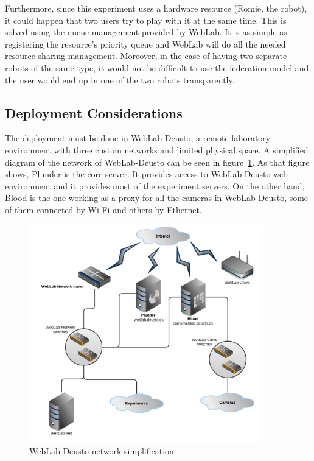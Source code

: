 Furthermore, since this experiment uses a hardware resource (Romie, the robot), it could happen that
two users try to play with it at the same time. This is solved using the queue management provided
by WebLab. It is as simple as registering the resource's priority queue and WebLab will do all the
needed resource sharing management. Moreover, in the case of having two separate robots of the same
type, it would not be difficult to use the federation model and the user would end up in one of the
two robots transparently.

\subsection{Deployment Considerations}

The deployment must be done in WebLab-Deusto, a remote laboratory environment with three custom
networks and limited physical space. A simplified diagram of the network of WebLab-Deusto can be
seen in figure~\ref{fig:weblab-network}. As that figure shows, Plunder is the core server. It
provides access to WebLab-Deusto web environment and it provides most of the experiment servers. On
the other hand, Blood is the one working as a proxy for all the cameras in WebLab-Deusto, some of
them connected by Wi-Fi and others by Ethernet.

\begin{figure}[!htbp]
	\centering
	\includegraphics[width=0.9\textwidth]{fig/weblab-network}
	\caption{WebLab-Deusto network simplification.}\label{fig:weblab-network}
\end{figure}

